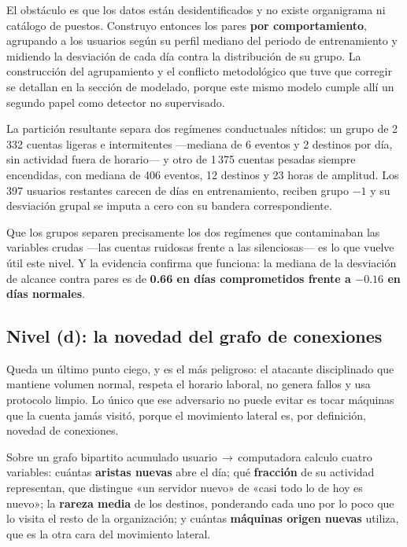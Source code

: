 \documentclass[12pt, a4paper]{article}
\begin{document}
El obstáculo es que los datos están desidentificados y no existe organigrama ni catálogo de puestos.
Construyo entonces los pares \textbf{por comportamiento}, agrupando a los usuarios según su perfil
mediano del periodo de entrenamiento y midiendo la desviación de cada día contra la distribución de
su grupo. La construcción del agrupamiento y el conflicto metodológico que tuve que corregir se
detallan en la sección de modelado, porque este mismo modelo cumple allí un segundo papel como
detector no supervisado.

La partición resultante separa dos regímenes conductuales nítidos: un grupo de 2\,332 cuentas ligeras
e intermitentes ---mediana de 6 eventos y 2 destinos por día, sin actividad fuera de horario--- y otro
de 1\,375 cuentas pesadas siempre encendidas, con mediana de 406 eventos, 12 destinos y 23 horas de
amplitud. Los 397 usuarios restantes carecen de días en entrenamiento, reciben grupo $-1$ y su
desviación grupal se imputa a cero con su bandera correspondiente.

Que los grupos separen precisamente los dos regímenes que contaminaban las variables crudas ---las
cuentas ruidosas frente a las silenciosas--- es lo que vuelve útil este nivel. Y la evidencia
confirma que funciona: la mediana de la desviación de alcance contra pares es de \textbf{0.66 en días
comprometidos frente a $-0.16$ en días normales}.

\subsection{Nivel (d): la novedad del grafo de conexiones}

Queda un último punto ciego, y es el más peligroso: el atacante disciplinado que mantiene volumen
normal, respeta el horario laboral, no genera fallos y usa protocolo limpio. Lo único que ese
adversario no puede evitar es tocar máquinas que la cuenta jamás visitó, porque el movimiento lateral
es, por definición, novedad de conexiones.

Sobre un grafo bipartito acumulado usuario\,$\rightarrow$\,computadora calculo cuatro variables:
cuántas \textbf{aristas nuevas} abre el día; qué \textbf{fracción} de su actividad representan, que
distingue «un servidor nuevo» de «casi todo lo de hoy es nuevo»; la \textbf{rareza media} de los
destinos, ponderando cada uno por lo poco que lo visita el resto de la organización; y cuántas
\textbf{máquinas origen nuevas} utiliza, que es la otra cara del movimiento lateral.
\end{document}
